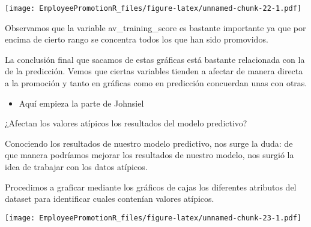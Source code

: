 \documentclass[
]{article}
\newenvironment{Shaded}{\begin{snugshade}}{\end{snugshade}}
\newcommand{\AttributeTok}[1]{\textcolor[rgb]{0.77,0.63,0.00}{#1}}
\newcommand{\FunctionTok}[1]{\textcolor[rgb]{0.00,0.00,0.00}{#1}}
\newcommand{\NormalTok}[1]{#1}
\newcommand{\OtherTok}[1]{\textcolor[rgb]{0.56,0.35,0.01}{#1}}
\newcommand{\SpecialCharTok}[1]{\textcolor[rgb]{0.00,0.00,0.00}{#1}}
\newcommand{\StringTok}[1]{\textcolor[rgb]{0.31,0.60,0.02}{#1}}
\providecommand{\tightlist}{%
  \setlength{\itemsep}{0pt}\setlength{\parskip}{0pt}}
\begin{document}
\texttt{[image: EmployeePromotionR\_files/figure-latex/unnamed-chunk-22-1.pdf]}

Observamos que la variable av\_training\_score es bastante importante ya
que por encima de cierto rango se concentra todos los que han sido
promovidos.

La conclusión final que sacamos de estas gráficas está bastante
relacionada con la de la predicción. Vemos que ciertas variables tienden
a afectar de manera directa a la promoción y tanto en gráficas como en
predicción concuerdan unas con otras.

\begin{itemize}
\tightlist
\item
  Aquí empieza la parte de Johnsiel
\end{itemize}

¿Afectan los valores atípicos los resultados del modelo predictivo?

Conociendo los resultados de nuestro modelo predictivo, nos surge la
duda: de que manera podríamos mejorar los resultados de nuestro modelo,
nos surgió la idea de trabajar con los datos atípicos.

Procedimos a graficar mediante los gráficos de cajas los diferentes
atributos del dataset para identificar cuales contenían valores
atípicos.

\begin{Shaded}
\end{Shaded}

\texttt{[image: EmployeePromotionR\_files/figure-latex/unnamed-chunk-23-1.pdf]}

\begin{Shaded}
\end{Shaded}
\end{document}
